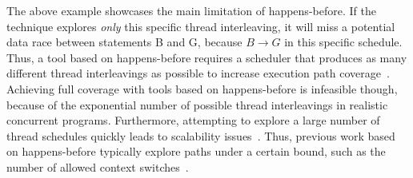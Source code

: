 The above example showcases the main limitation of happens-before. If the technique explores \emph{only} this specific thread interleaving, it will miss a potential data race between statements B and G, because $B \rightarrow G$ in this specific schedule. Thus, a tool based on happens-before requires a scheduler that produces as many different thread interleavings as possible to increase execution path coverage~\cite{savage1997eraser}. Achieving full coverage with tools based on happens-before is infeasible though, because of the exponential number of possible thread interleavings in realistic concurrent programs. Furthermore, attempting to explore a large number of thread schedules quickly leads to scalability issues~\cite{musuvathi2008finding}. Thus, previous work based on happens-before typically explore paths under a certain bound, such as the number of allowed context switches~\cite{qadeer2004kiss}.